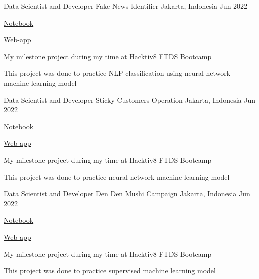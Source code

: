 

\begin{cventries}

  \cventry
    {Data Scientist and Developer} %
    {Fake News Identifier} %
    {Jakarta, Indonesia} %
    {Jun 2022} %
    {
      \begin{cvitems} %
        \item {\href{https://github.com/NikkiSatmaka/fake-news-identifier/blob/main/h8dsft_Milestone2P2_nikki_satmaka.ipynb}{Notebook}}
        \item {\href{https://fake-news-identifier.herokuapp.com/}{Web-app}}
        \item{My milestone project during my time at Hacktiv8 FTDS Bootcamp}
        \item{This project was done to practice NLP classification using neural network machine learning model}
      \end{cvitems}
    }

  \cventry
    {Data Scientist and Developer} %
    {Sticky Customers Operation} %
    {Jakarta, Indonesia} %
    {Jun 2022} %
    {
      \begin{cvitems} %
        \item {\href{https://github.com/NikkiSatmaka/fake-news-identifier/blob/main/h8dsft_Milestone2P2_nikki_satmaka.ipynb}{Notebook}}
        \item {\href{https://fake-news-identifier.herokuapp.com/}{Web-app}}
        \item {My milestone project during my time at Hacktiv8 FTDS Bootcamp}
        \item {This project was done to practice neural network machine learning model}
      \end{cvitems}
    }

  \cventry
    {Data Scientist and Developer} %
    {Den Den Mushi Campaign} %
    {Jakarta, Indonesia} %
    {Jun 2022} %
    {
      \begin{cvitems} %
        \item {\href{https://github.com/NikkiSatmaka/dendenmushi-campaign/blob/main/h8dsft_Milestone2P1_nikki_satmaka.ipynb}{Notebook}}
        \item {\href{https://dendenmushi-campaign.herokuapp.com/}{Web-app}}
        \item {My milestone project during my time at Hacktiv8 FTDS Bootcamp}
        \item {This project was done to practice supervised machine learning model}
      \end{cvitems}
    }


\end{cventries}
